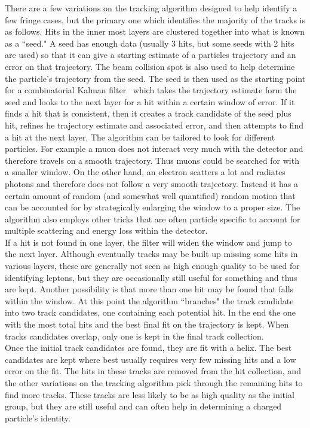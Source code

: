 	There are a few variations on the tracking algorithm designed to help identify a few fringe cases, but the primary one which identifies the majority of the tracks is as follows. Hits in the inner most layers are clustered together into what is known as a ``seed." A seed has enough data (usually 3 hits, but some seeds with 2 hits are used) so that it can give a starting estimate of a particles trajectory and an error on that trajectory. The beam collision spot is also used to help determine the particle's trajectory from the seed. The seed is then used as the starting point for a combinatorial Kalman filter~\cite{ckf} which takes the trajectory estimate form the seed and looks to the next layer for a hit within a certain window of error. If it finds a hit that is consistent, then it creates a track candidate of the seed plus hit, refines he trajectory estimate and associated error, and then attempts to find a hit at the next layer. The algorithm can be tailored to look for different particles. For example a muon does not interact very much with the detector and therefore travels on a smooth trajectory. Thus muons could be searched for with a smaller window. On the other hand, an electron scatters a lot and radiates photons and therefore does not follow a very smooth trajectory. Instead it has a certain amount of random (and somewhat well quantified) random motion that can be accounted for by strategically enlarging the window to a proper size. The algorithm also employs other tricks that are often particle specific to account for multiple scattering and energy loss within the detector.\\
	
	If a hit is not found in one layer, the filter will widen the window and jump to the next layer. Although eventually tracks may be built up missing some hits in various layers, these are generally not seen as high enough quality to be used for identifying leptons, but they are occasionally still useful for something and thus are kept. Another possibility is that more than one hit may be found that falls within the window. At this point the algorithm ``branches" the track candidate into two track candidates, one containing each potential hit. In the end the one with the most total hits and the best final fit on the trajectory is kept. When tracks candidates overlap, only one is kept in the final track collection.\\
	
	Once the initial track candidates are found, they are fit with a helix. The best candidates are kept where best usually requires very few missing hits and a low error on the fit. The hits in these tracks are removed from the hit collection, and the other variations on the tracking algorithm pick through the remaining hits to find more tracks. These tracks are less likely to be as high quality as the initial group, but they are still useful and can often help in determining a charged particle's identity.\\
	
